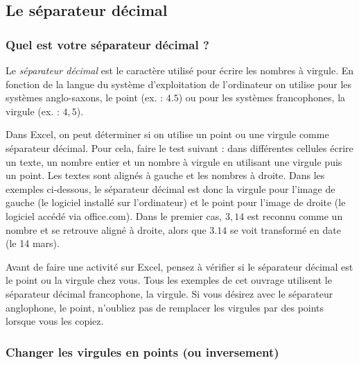 \subsection{Le séparateur décimal}\label{Calc2SeparateurDecimal}



\subsubsection{Quel est votre séparateur décimal ?}


Le \emph{séparateur décimal} est le caractère utilisé pour écrire les nombres à virgule. En fonction de la langue du système d'exploitation de l'ordinateur on utilise pour les systèmes anglo-saxons, le point (ex. : $4.5$) ou pour les systèmes francophones, la virgule (ex. : $4,5$).

\vspace{6pt}

Dans Excel, on peut déterminer si on utilise un point ou une virgule comme séparateur décimal. Pour cela, faire le test suivant : dans différentes cellules écrire un texte, un nombre entier et un nombre à virgule en utilisant une virgule puis un point. Les textes sont alignés à gauche et les nombres à droite. Dans les exemples ci-dessous, le séparateur décimal est donc la virgule pour l'image de gauche (le logiciel installé sur l'ordinateur) et le point pour l'image de droite (le logiciel accédé via office.com). Dans le premier cas, $3,14$ est reconnu comme un nombre et se retrouve aligné à droite, alors que $3.14$ se voit transformé en date (le 14 mars).


Avant de faire une activité sur Excel, pensez à vérifier si le séparateur décimal est le point ou la virgule chez vous. Tous les exemples de cet ouvrage utilisent le séparateur décimal francophone, la virgule. Si vous désirez avec le séparateur anglophone, le point, n'oubliez pas de remplacer les virgules par des points lorsque vous les copiez.

\subsubsection{Changer les virgules en points (ou inversement)}

